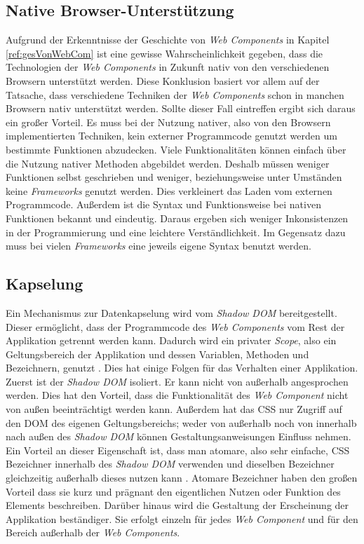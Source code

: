 \documentclass[12pt, paper=a4, bibtotoc, toc=listof, headsepline=true, numbers=endperiod]{scrreprt}
\begin{document}
			\subsection{Native Browser-Unterstützung}
			\label{sec:natBro}
			Aufgrund der Erkenntnisse der Geschichte von \emph{Web Components} in Kapitel \ref{ref:gesVonWebCom} ist eine gewisse Wahrscheinlichkeit gegeben, dass die Technologien der \emph{Web Components} in Zukunft nativ von den verschiedenen Browsern unterstützt werden. Diese Konklusion basiert vor allem auf der Tatsache, dass verschiedene Techniken der \emph{Web Components} schon in manchen Browsern nativ unterstützt werden.
			Sollte dieser Fall eintreffen ergibt sich daraus ein großer Vorteil. Es muss bei der Nutzung nativer, also von den Browsern implementierten Techniken, kein externer Programmcode genutzt werden um bestimmte Funktionen abzudecken. Viele Funktionalitäten können einfach über die Nutzung nativer Methoden abgebildet werden. Deshalb müssen weniger Funktionen selbst geschrieben und weniger, beziehungsweise unter Umständen keine \emph{Frameworks} genutzt werden. Dies verkleinert das Laden vom externen Programmcode. Außerdem ist die Syntax und Funktionsweise bei nativen Funktionen bekannt und eindeutig. Daraus ergeben sich weniger Inkonsistenzen in der Programmierung und eine leichtere Verständlichkeit. Im Gegensatz dazu muss bei vielen \emph{Frameworks} eine jeweils eigene Syntax benutzt werden.
			\subsection{Kapselung}
			Ein Mechanismus zur Datenkapselung wird vom \emph{Shadow DOM} bereitgestellt.
			Dieser ermöglicht, dass der Programmcode des \emph{Web Components} vom Rest der Applikation getrennt werden kann. Dadurch wird ein privater \emph{Scope}, also ein Geltungsbereich der Applikation und dessen Variablen, Methoden und Bezeichnern, genutzt \cite[S.2]{patel2015learning}. Dies hat einige Folgen für das Verhalten einer Applikation. Zuerst ist der \emph{Shadow \ac{DOM}} isoliert. Er kann nicht von außerhalb angesprochen werden. Dies hat den Vorteil, dass die Funktionalität des \emph{Web Component} nicht von außen beeinträchtigt werden kann. Außerdem hat das \ac{CSS} nur Zugriff auf den \ac{DOM} des eigenen Geltungsbereichs; weder von außerhalb noch von innerhalb nach außen des \emph{Shadow \ac{DOM}} können Gestaltungsanweisungen Einfluss nehmen. Ein Vorteil an dieser Eigenschaft ist, dass man atomare, also sehr einfache, \ac{CSS} Bezeichner innerhalb des \emph{Shadow \ac{DOM}} verwenden und dieselben Bezeichner gleichzeitig außerhalb dieses nutzen kann \cite{Bidelman2016}. Atomare Bezeichner haben den großen Vorteil dass sie kurz und prägnant den eigentlichen Nutzen oder Funktion des Elements beschreiben. Darüber hinaus wird die Gestaltung der Erscheinung der Applikation beständiger. Sie erfolgt einzeln für jedes \emph{Web Component} und für den Bereich außerhalb der \emph{Web Components}.
\end{document}
